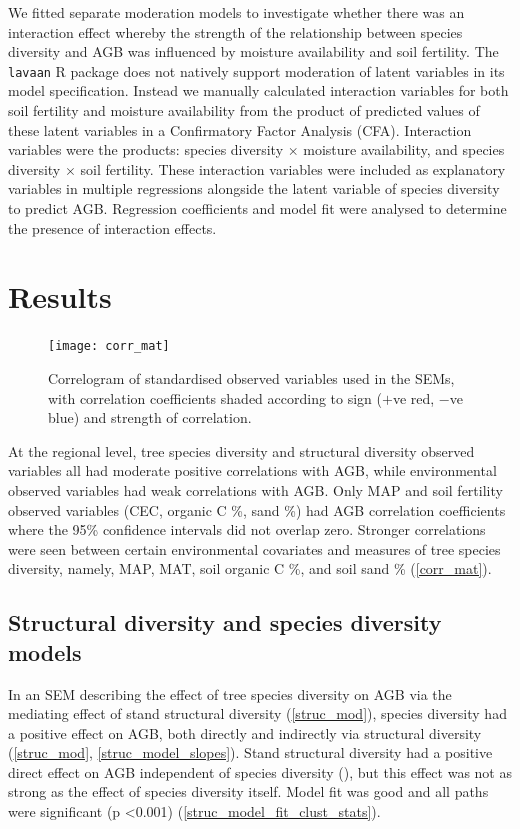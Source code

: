 \documentclass[11pt,a4paper]{article}
\begin{document}
We fitted separate moderation models to investigate whether there was an interaction effect whereby the strength of the relationship between species diversity and AGB was influenced by moisture availability and soil fertility. The \verb|lavaan| R package does not natively support moderation of latent variables in its model specification. Instead we manually calculated interaction variables for both soil fertility and moisture availability from the product of predicted values of these latent variables in a Confirmatory Factor Analysis (CFA). Interaction variables were the products: species diversity $\times$ moisture availability, and species diversity $\times$ soil fertility. These interaction variables were included as explanatory variables in multiple regressions alongside the latent variable of species diversity to predict AGB. Regression coefficients and model fit were analysed to determine the presence of interaction effects.

\section{Results}

\begin{figure}[H]
\centering
	\texttt{[image: corr\_mat]}
	\caption{Correlogram of standardised observed variables used in the SEMs, with correlation coefficients shaded according to sign ($+$ve red, $-$ve blue) and strength of correlation.}
	\label{corr_mat}
\end{figure}

At the regional level, tree species diversity and structural diversity observed variables all had moderate positive correlations with AGB, while environmental observed variables had weak correlations with AGB. Only MAP and soil fertility observed variables (CEC, organic C \%, sand \%) had AGB correlation coefficients where the 95\% confidence intervals did not overlap zero. Stronger correlations were seen between certain environmental covariates and measures of tree species diversity, namely, MAP, MAT, soil organic C \%, and soil sand \% (\autoref{corr_mat}).

\subsection{Structural diversity and species diversity models}

In an SEM describing the effect of tree species diversity on AGB via the mediating effect of stand structural diversity (\autoref{struc_mod}), species diversity had a positive effect on AGB, both directly and indirectly via structural diversity (\autoref{struc_mod}, \autoref{struc_model_slopes}). Stand structural diversity had a positive direct effect on AGB independent of species diversity (), but this effect was not as strong as the effect of species diversity itself. Model fit was good and all paths were significant (p <0.001) (\autoref{struc_model_fit_clust_stats}). 
\end{document}
